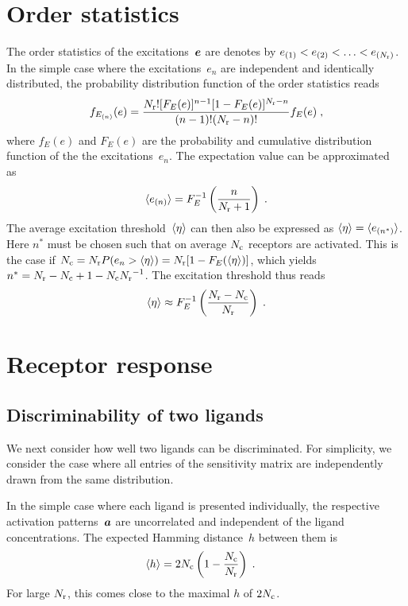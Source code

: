 \documentclass[twocolumn, superscriptaddress]{revtex4}
\newcommand{\Nc}{{N_{\rm c}}}
\newcommand{\Nr}{{N_{\rm r}}}
\begin{document}
\section{Order statistics}
The order statistics of the excitations~$\boldsymbol e$ are denotes by $e_{(1)} < e_{(2)} < \ldots < e_{(\Nr)}$.
In the simple case where the excitations~$e_n$ are independent and identically distributed, the probability distribution function of the order statistics reads
\begin{align}
	f_{E_{(n)}}(e) =
		\frac{N_{\rm r}![F_E(e)]^{n-1}[1-F_E(e)]^{N_{\rm r} - n}}{(n-1)!(N_{\rm r}-n)!} f_E(e)
	\;,
\end{align}
where $f_E(e)$ and $F_E(e)$ are the probability and cumulative distribution function of the the excitations~$e_n$.
The expectation value can be approximated as~\cite[Eq.~(4.5.1)]{David1970}
\begin{align}
	\mean{e_{(n)}} = F_E^{-1}\left( \frac{n}{\Nr + 1} \right)
	\label{eqn:en_order_statistics_mean}
	\;.
\end{align}
The average excitation threshold~$\langle \eta \rangle$ can then also be expressed as $\langle \eta \rangle = \langle e_{(n^*)} \rangle$.
Here $n^*$ must be chosen such that on average $\Nc$ receptors are activated.
This is the case if $\Nc = \Nr P(e_n > \mean\eta) = \Nr[1 - F_E(\mean\eta)]$, which yields
$n^* = \Nr - \Nc + 1 - \Nc\Nr^{-1}$.
The excitation threshold thus reads
\begin{align}
	\mean\eta \approx F_E^{-1}\left( \frac{\Nr - \Nc}{\Nr} \right)
	\label{eqn:excitation_threshold}
	\;.
\end{align}

\section{Receptor response}

\subsection{Discriminability of two ligands}
We next consider how well two ligands can be discriminated.
For simplicity, we consider the case where all entries of the sensitivity matrix are independently drawn from the same distribution.

In the simple case where each ligand is presented individually, the respective activation patterns~$\boldsymbol a$ are uncorrelated and independent of the ligand concentrations.
The expected Hamming distance~$h$ between them is
\begin{align}
	\mean{h} &= 2\Nc\left(1 - \frac{\Nc}{\Nr}\right)
	\label{eqn:discriminability_independent}
	\;.
\end{align}
For large $\Nr$, this comes close to the maximal $h$ of $2\Nc$.
\end{document}
